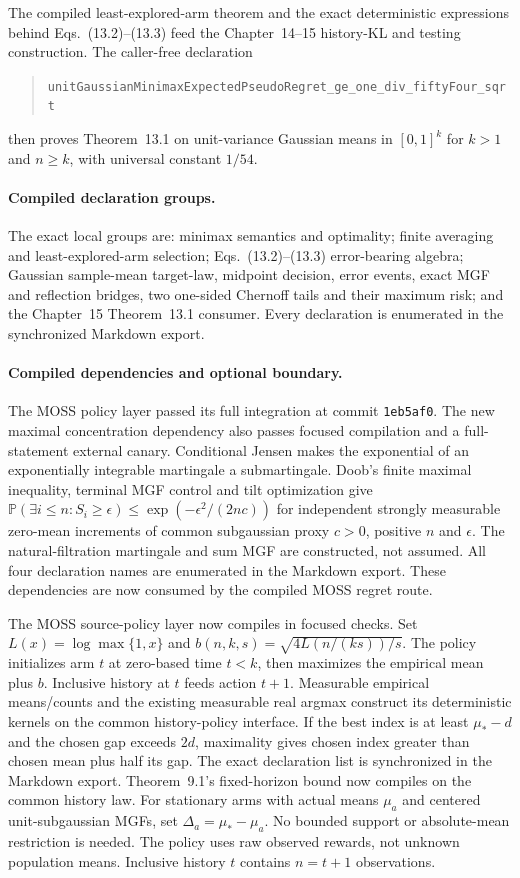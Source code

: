 The compiled least-explored-arm theorem and the exact deterministic
expressions behind Eqs.~(13.2)--(13.3) feed the Chapter~14--15 history-KL and
testing construction. The caller-free declaration
\begin{quote}\raggedright
\texttt{unitGaussianMinimaxExpectedPseudoRegret\_\allowbreak ge\_\allowbreak one\_\allowbreak div\_\allowbreak fiftyFour\_\allowbreak sqrt}
\end{quote}
then proves Theorem~13.1 on unit-variance Gaussian means in $[0,1]^k$ for
$k>1$ and $n\ge k$, with universal constant $1/54$.

\paragraph{Compiled declaration groups.}
The exact local groups are: minimax semantics and optimality; finite averaging
and least-explored-arm selection; Eqs.~(13.2)--(13.3) error-bearing algebra;
Gaussian sample-mean target-law, midpoint decision, error events, exact MGF
and reflection bridges, two one-sided Chernoff tails and their maximum risk;
and the Chapter~15 Theorem~13.1 consumer.
Every declaration is enumerated in the synchronized Markdown export.

\paragraph{Compiled dependencies and optional boundary.}
The MOSS policy layer passed its full integration at commit
\texttt{1eb5af0}. The new maximal concentration dependency also passes
focused compilation and a full-statement external canary.
Conditional Jensen makes the exponential of an exponentially integrable
martingale a submartingale. Doob's finite maximal inequality, terminal MGF
control and tilt optimization give
$\mathbb P(\exists i\le n:S_i\ge\epsilon)
\le \exp(-\epsilon^2/(2nc))$
for independent strongly measurable zero-mean increments of common
subgaussian proxy $c>0$, positive $n$ and $\epsilon$.
The natural-filtration martingale and sum MGF are constructed, not assumed.
All four declaration names are enumerated in the Markdown export.
These dependencies are now consumed by the compiled MOSS regret route.

The MOSS source-policy layer now compiles in focused checks.
Set $L(x)=\log\max\{1,x\}$ and
$b(n,k,s)=\sqrt{4L(n/(ks))/s}$.
The policy initializes arm $t$ at zero-based time $t<k$, then maximizes
the empirical mean plus $b$. Inclusive history at $t$ feeds action $t+1$.
Measurable empirical means/counts and the existing measurable real argmax
construct its deterministic kernels on the common history-policy interface.
If the best index is at least $\mu_* - d$ and the chosen gap exceeds $2d$,
maximality gives chosen index greater than chosen mean plus half its gap.
The exact declaration list is synchronized in the Markdown export.
Theorem~9.1's fixed-horizon bound now compiles on the common history law.
For stationary arms with actual means $\mu_a$ and centered unit-subgaussian
MGFs, set $\Delta_a=\mu_*-\mu_a$. No bounded support or absolute-mean
restriction is needed. The policy uses raw observed rewards, not unknown
population means. Inclusive history $t$ contains $n=t+1$ observations.

